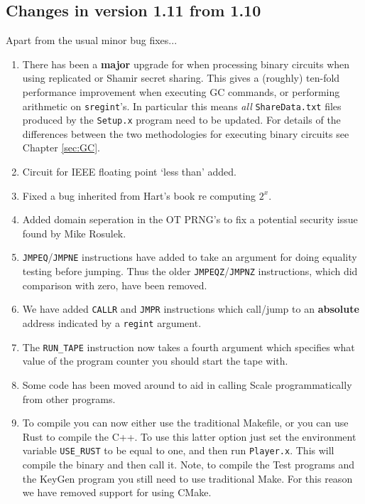 \subsection{Changes in version 1.11 from 1.10}
Apart from the usual minor bug fixes...
\begin{enumerate}
\item There has been a {\bf major} upgrade for when processing binary
	circuits when using replicated or Shamir secret sharing.
	This gives a (roughly) ten-fold performance improvement
	when executing GC commands, or performing arithmetic on
	\verb+sregint+'s.
	In particular this means {\em all} \verb|ShareData.txt|
	files produced by the \verb|Setup.x| program need to
	be updated.
	For details of the differences between the two methodologies
	for executing binary circuits see Chapter \ref{sec:GC}.
\item Circuit for IEEE floating point `less than' added.
\item Fixed a bug inherited from Hart's book re computing $2^x$.
\item Added domain seperation in the OT PRNG's to fix a potential
	security issue found by Mike Rosulek.
\item \verb|JMPEQ|/\verb|JMPNE| instructions have added to take
	an argument for doing equality testing before jumping.
	Thus the older \verb|JMPEQZ|/\verb|JMPNZ| instructions,
	which did comparison with zero, have been removed.
\item We have added \verb|CALLR| and \verb|JMPR| instructions which
	call/jump to an {\bf absolute} address indicated by
      a \verb|regint| argument.
\item The \verb|RUN_TAPE| instruction now takes a fourth argument which
	specifies what value of the program counter you should start the
	tape with.
\item Some code has been moved around to aid in calling Scale programmatically from other programs.
\item To compile you can now either use the traditional Makefile, or
	you can use Rust to compile the C++. 
	To use this latter option just set the environment variable
	\verb|USE_RUST| to be equal to one, and then run \verb|Player.x|.
	This will compile the binary and then call it.
	Note, to compile the Test programs and the KeyGen program you
	still need to use traditional Make.
	For this reason we have removed support for using CMake.
\end{enumerate}

